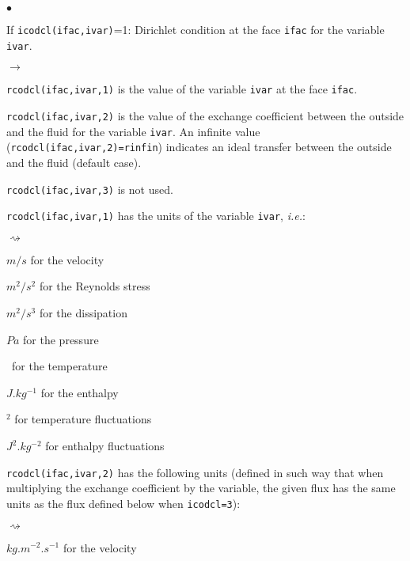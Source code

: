 {{{\begin{list}{$\bullet$}{}
\item If \texttt{icodcl(ifac,ivar)}=1: Dirichlet condition at the face
      \texttt{ifac} for the variable \texttt{ivar}.

\begin{list}{$\rightarrow$}{}
\item \texttt{rcodcl(ifac,ivar,1)} is the value of the variable \texttt{ivar}
      at the face \texttt{ifac}.

\item \texttt{rcodcl(ifac,ivar,2)} is the value of the exchange coefficient
      between the outside and the fluid for the variable \texttt{ivar}. An
      infinite value (\texttt{rcodcl(ifac,ivar,2)=rinfin}) indicates an
      ideal transfer between the outside and the fluid (default case).

\item \texttt{rcodcl(ifac,ivar,3)} is not used.

\item \texttt{rcodcl(ifac,ivar,1)} has the units of the variable
      \texttt{ivar}, {\em i.e.}:
\begin{list}{$\rightsquigarrow$}{}
\item $m/s$ for the velocity

\item $m^2/s^2$ for the Reynolds stress

\item $m^2/s^3$ for the dissipation

\item $Pa$ for the pressure

\item \degresC\ for the temperature

\item $J.kg^{-1}$ for the enthalpy

\item \degresC$^2$ for temperature fluctuations

\item $J^2.kg^{-2}$ for enthalpy fluctuations
\end{list}

\item \texttt{rcodcl(ifac,ivar,2)} has the following units (defined in such way
      that when multiplying the exchange coefficient by the variable, the
      given flux has the same units as the flux defined below when
      \texttt{icodcl=3}):

\begin{list}{$\rightsquigarrow$}{}
\item $kg.m^{-2}.s^{-1}$ for the velocity


\end{list}
\end{list}
\end{list}}}}
